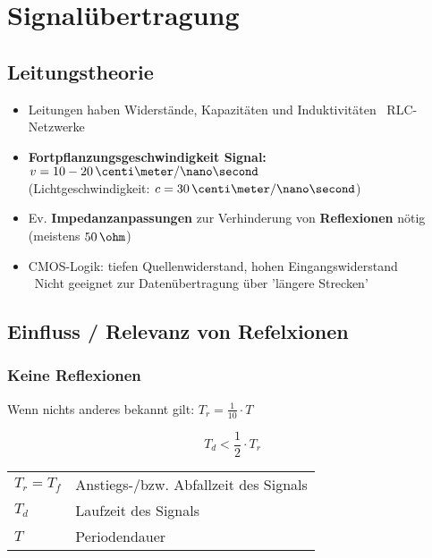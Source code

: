\section{Signalübertragung}

\subsection{Leitungstheorie}

\begin{itemize}
    \item Leitungen haben Widerstände, Kapazitäten und Induktivitäten \textrightarrow\ RLC-Netzwerke
    \item \textbf{Fortpflanzungsgeschwindigkeit Signal:} $v = 10 - 20 \, \centi \meter / \nano \second$ \\
        (Lichtgeschwindigkeit: $c = 30 \, \centi \meter / \nano \second$)
    \item Ev. \textbf{Impedanzanpassungen} zur Verhinderung von \textbf{Reflexionen} nötig (meistens $50 \, \ohm$)
    \item CMOS-Logik: tiefen Quellenwiderstand, hohen Eingangswiderstand \\
        \textrightarrow\ Nicht geeignet zur Datenübertragung über 'längere Strecken'
\end{itemize}


\subsection{Einfluss / Relevanz von Refelxionen}

\subsubsection{Keine Reflexionen}

Wenn nichts anderes bekannt gilt: $T_r = \frac{1}{10} \cdot T$ 

\begin{minipage}[c]{0.19\columnwidth}
    $$ \boxed{ T_d < \frac{1}{2} \cdot T_r} $$
\end{minipage}
\hfill
\begin{minipage}[c]{0.79\columnwidth}
    \begin{tabular}{ll}
        $T_r = T_f$&Anstiegs-/bzw. Abfallzeit des Signals \\
        $T_d$      &Laufzeit des Signals \\
        $T$        &Periodendauer
    \end{tabular}
\end{minipage}


